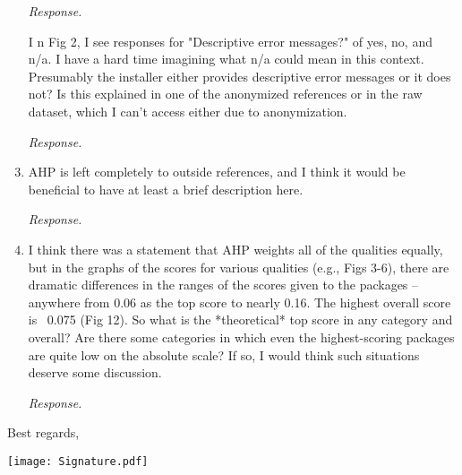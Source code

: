 \documentclass[12pt]{casletter}
\begin{document}
\begin{letter}
\begin{enumerate}
    \emph{Response. \smallskip}

  \item [I]n Fig 2, I see responses for "Descriptive error messages?" of yes, no,
  and n/a.  I have a hard time imagining what n/a could mean in this context.
  Presumably the installer either provides descriptive error messages or it does
  not?  Is this explained in one of the anonymized references or in the raw
  dataset, which I can't access either due to anonymization. \medskip

    \emph{Response. \smallskip}

  \item AHP is left completely to outside references, and I think it would be
  beneficial to have at least a brief description here. \medskip

    \emph{Response. \smallskip}

  \item I think there was a statement that AHP weights all of the qualities
  equally, but in the graphs of the scores for various qualities (e.g., Figs
  3-6), there are dramatic differences in the ranges of the scores given to the
  packages -- anywhere from 0.06 as the top score to nearly 0.16.  The highest
  overall score is ~0.075 (Fig 12). So what is the *theoretical* top score in
  any category and overall?  Are there some categories in which even the
  highest-scoring packages are quite low on the absolute scale?  If so, I would
  think such situations deserve some discussion. \medskip

    \emph{Response. \smallskip}

  \end{enumerate}

  \closing{Best regards,~\newline} \vspace{-29mm}
  \texttt{[image: Signature.pdf]}

\end {letter}
\end{document}
